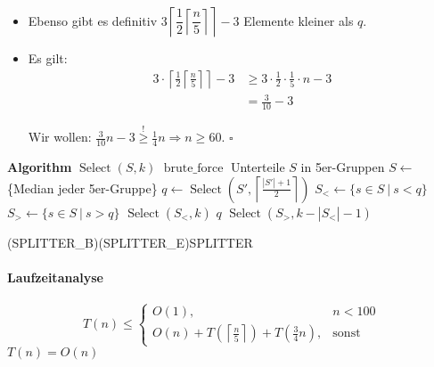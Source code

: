 \begin{description}
\begin{itemize}
		 \item Ebenso gibt es definitiv $3 \left\lceil\dfrac{1}{2}\left\lceil\dfrac{n}{5}\right\rceil\right\rceil - 3$ Elemente kleiner als $q$.
		 \item Es gilt:
				\begin{align*}
				 3 \cdot \left\lceil\frac{1}{2}\left\lceil\frac{n}{5}\right\rceil\right\rceil - 3 &\geq
				3 \cdot \frac{1}{2} \cdot \frac{1}{5} \cdot n - 3 \\
					&= \frac{3}{10} - 3
				\end{align*}
				\begin{center}
				Wir wollen: $\frac{3}{10} n - 3 \overset{!}{\geq} \frac{1}{4} n \Rightarrow n \geq 60$. \hfill$\square$
				\end{center}
			\end{itemize}
		\hspace{2cm}
		\begin{minipage}{0.7\textwidth}
		\begin{algorithmic}
		\STATE \textbf{Algorithm} $\operatorname{Select}(S, k)$
				\STATE $\operatorname{brute\_force}$
			\ENDIF
			\STATE {}\vspace*{-1em}
			\STATE Unterteile $S$ in 5er-Gruppen
			\STATE $S \gets$ \{Median jeder 5er-Gruppe\}
			\STATE {}$q \gets \operatorname{Select}\left(S', \left\lceil\frac{|S'| + 1}{2}\right\rceil\right)$
			\STATE $S_< \gets \{s \in S\ |\ s < q\}$
			\STATE $S_> \gets \{s \in S\ |\ s > q\}$
				\RETURN $\operatorname{Select}(S_<,k)$
				\RETURN $q$
			\ELSE %
				\RETURN $\operatorname{Select}(S_>,k - \left|S_<\right| - 1)$
			\ENDIF
		\end{algorithmic}
		\end{minipage}
		\psbrace*[rot=180,nodesepA=-1.8cm,nodesepB=0.5em](SPLITTER_B)(SPLITTER_E){SPLITTER}
		\paragraph*{Laufzeitanalyse}
		\[T(n) \leq \begin{cases}
		             O(1), & n < 100 \\
					 O(n) + T\left(\left\lceil\frac{n}{5}\right\rceil\right) + T\left(\frac{3}{4} n\right), & \text{sonst}
		            \end{cases}\]
		\Beh $T(n) = O(n)$

\end{description}
